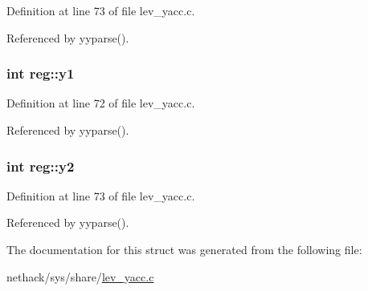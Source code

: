 Definition at line 73 of file lev\+\_\+yacc.\+c.



Referenced by yyparse().

\hypertarget{structreg_a5c9850f86e80d152080f032572dec958}{
\subsubsection[{y1}]{\setlength{\rightskip}{0pt plus 5cm}int reg\+::y1}}\label{structreg_a5c9850f86e80d152080f032572dec958}


Definition at line 72 of file lev\+\_\+yacc.\+c.



Referenced by yyparse().

\hypertarget{structreg_a16227244e3d60fed8afab866fcb1403f}{
\subsubsection[{y2}]{\setlength{\rightskip}{0pt plus 5cm}int reg\+::y2}}\label{structreg_a16227244e3d60fed8afab866fcb1403f}


Definition at line 73 of file lev\+\_\+yacc.\+c.



Referenced by yyparse().



The documentation for this struct was generated from the following file\+:\begin{DoxyCompactItemize}
\item 
nethack/sys/share/\hyperlink{lev__yacc_8c}{lev\+\_\+yacc.\+c}\end{DoxyCompactItemize}
